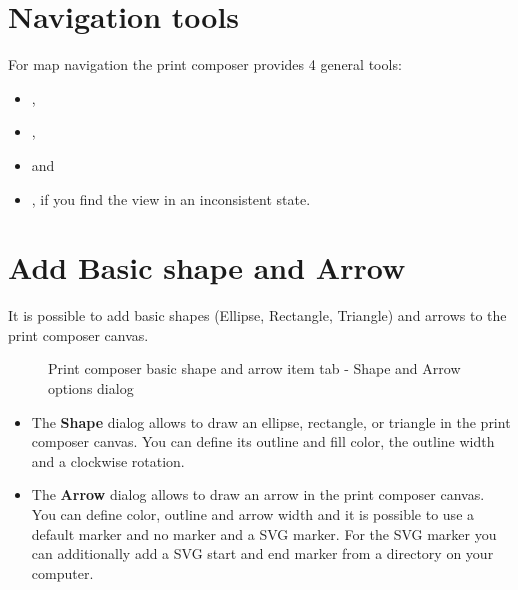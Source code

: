 \section{Navigation tools}

For map navigation the print composer provides 4 general tools:

\begin{itemize}[label=--]
\item {},
\item {},
\item {} and
\item {}, if you find the view in an
inconsistent state.
\end{itemize}

\section{Add Basic shape and Arrow}

It is possible to add basic shapes (Ellipse, Rectangle, Triangle) and arrows
to the print composer canvas.

\begin{figure}[ht]
\centering
{}
\hspace{1cm}
\caption{Print composer basic shape and arrow item tab - Shape and Arrow options dialog \nixcaption}\label{fig:shapearrow}
\end{figure}

\begin{itemize}[label=--]
\item The \textbf{Shape} dialog allows to draw an ellipse, rectangle, or
triangle in the print composer canvas. You can define its outline and fill
color, the outline width and a clockwise rotation.
\item The \textbf{Arrow} dialog allows to draw an arrow in the print composer
canvas. You can define color, outline and arrow width and it is possible to
use a default marker and no marker and a SVG marker. For the SVG marker you
can additionally add a SVG start and end marker from a directory on your
computer.
\end{itemize}

